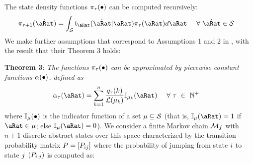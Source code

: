 \documentclass[../BufferStockTheory.tex]{subfiles}\usepackage{ApndxSteadyState}
\begin{document}
  The state density functions $\pi_{\tau}(\bullet)$ can be computed recursively:
  \begin{align}
    \pDens_{\tAbs+1}(\Nxt{\point}) &= \int_{\DistSetSprtFull} \trns_{\point}(\Nxt{\point}|\point)\pDens_{\tAbs}(\point)d\point ~~~~ \forall~\Nxt{\point} \in \DistSetSprtFull \label{eq:stateDensity}
  \end{align}
  We make further assumptions that correspond to Assumptions 1 and 2 in \cite{saDiscretize}, with the result that their Theorem 3 holds:
  \begin{comment} %
  \textbf{Assumption \ref{assn:Bounded}} For given sets $\TrnsSetSprtTrnc \subset \DistSetSprtFull^{2}$ and $\DistSetSprtTrnc_{0} \subset \DistSetSprtFull$, there exist positive constants $\epsilon$ and $\epsilon_{0}$, such that $\trns_{\point}(\Nxt{\point}|\point) $ and $\pDens_{0}(\point)$ satisfy the following conditions:
  \begin{align}
    \trns_{\point}(\Nxt{\point}|\point) \leq \epsilon ~~~~\forall(\point,\Nxt{\point})~\in~\DistSetSprtFull \backslash \TrnsSetSprtTrnc, \text{~and~} \pDens_{0}(\point) \leq \epsilon_{0}
  \end{align}
  \textbf{Assumption \ref{assn:Lipschitz}} see \cite{eaDiscretize} Assumption 2.
\end{comment}
  \textbf{Theorem 3}: \textit{The functions $\pi_{\tau}(\bullet)$ can  be approximated by piecewise constant functions $\alpha(\bullet)$, defined as}
  \begin{align}\label{eq:PrbBinNxtFmPntNow}
    \pContAprx_{\tAbs}(\point) &= \sum_{\ptsLoopC=1}^{\StNum} \frac{\pDistDscr_{\tAbs}(\ptsLoopC)}{\Lebes(\SetSub_{\ptsLoopC})} \mathbb{I}_{\SetSub_{\ptsLoopC}}(\point)~~~~\forall~\tAbs~\in~\Nteger^{+}
  \end{align}where $\mathbb{I}_{\mu}(\bullet)$ is the indicator function of a set $\mu \subseteq \mathcal{S}$ (that is, $\mathbb{I}_{\SetSub}(\point) = 1$ if $\point \in \SetSub$; else $\mathbb{I}_{\SetSub}(\point) = 0$).  %
  We consider a finite Markov chain $\mathcal{M}_{f}$ with $n+1$ discrete abstract states over this space characterized by the transition probability matrix $P = [P_{ij}]$ where the probability of jumping from state $i$ to state $j$ $(P_{i,j})$ is computed as:
\end{document}
